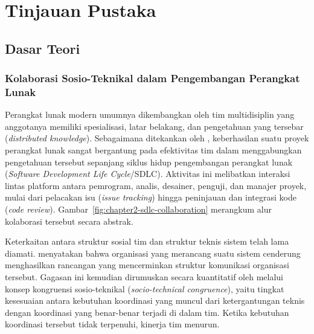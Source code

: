 %
%
%
%
%

\chapter{Tinjauan Pustaka}

\section{Dasar Teori}

\subsection{Kolaborasi Sosio-Teknikal dalam Pengembangan Perangkat Lunak}
Perangkat lunak modern umumnya dikembangkan oleh tim multidisiplin yang anggotanya memiliki spesialisasi, latar belakang, dan pengetahuan yang tersebar (\textit{distributed knowledge}).
Sebagaimana ditekankan oleh \textcite{gote2023locating}, keberhasilan suatu proyek perangkat lunak sangat bergantung pada efektivitas tim dalam menggabungkan pengetahuan tersebut sepanjang siklus hidup pengembangan perangkat lunak (\textit{Software Development Life Cycle}/SDLC).
Aktivitas ini melibatkan interaksi lintas platform antara pemrogram, analis, desainer, penguji, dan manajer proyek, mulai dari pelacakan isu (\textit{issue tracking}) hingga peninjauan dan integrasi kode (\textit{code review}).
Gambar~\ref{fig:chapter2-sdlc-collaboration} merangkum alur kolaborasi tersebut secara abstrak.



Keterkaitan antara struktur sosial tim dan struktur teknis sistem telah lama diamati.
\textcite{conway1968committees} menyatakan bahwa organisasi yang merancang suatu sistem cenderung menghasilkan rancangan yang mencerminkan struktur komunikasi organisasi tersebut.
Gagasan ini kemudian dirumuskan secara kuantitatif oleh \textcite{cataldo2008congruence} melalui konsep kongruensi sosio-teknikal (\textit{socio-technical congruence}), yaitu tingkat kesesuaian antara kebutuhan koordinasi yang muncul dari ketergantungan teknis dengan koordinasi yang benar-benar terjadi di dalam tim.
Ketika kebutuhan koordinasi tersebut tidak terpenuhi, kinerja tim menurun.

